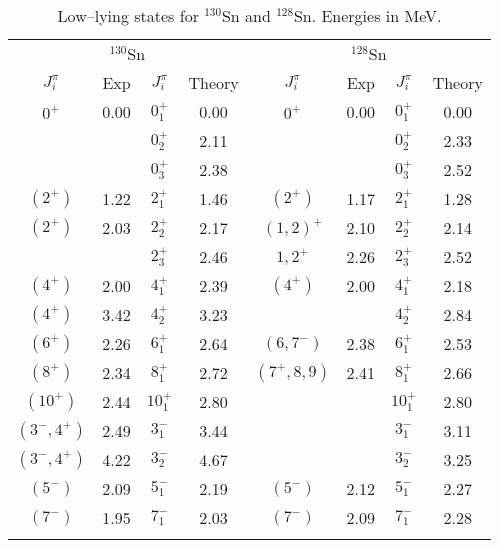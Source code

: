 \begin{table}[htbp]
\begin{center}
\begin{tabular}{cccc|cccc}
\hline
\multicolumn{4}{c}{ $^{130}$Sn} & \multicolumn{4}{c}{ $^{128}$Sn} \\ 
{$J^{\pi}_i$} & {Exp} & {$J^{\pi}_i$} & {Theory} & 
{$J^{\pi}_i$} & {Exp} & {$J^{\pi}_i$} & {Theory} \\
\hline 
$0^{+}$ & 0.00 & $0^{+}_{1}$ & 0.00 &
  $0^{+}$ & 0.00 & $0^{+}_{1}$ & 0.00 \\
        &      & $0^{+}_{2}$ & 2.11 &
          &      & $0^{+}_{2}$ & 2.33 \\
        &      & $0^{+}_{3}$ & 2.38 &
          &      & $0^{+}_{3}$ & 2.52 \\
$(2^{+})$ & 1.22 & $2^{+}_{1}$ & 1.46 &
  $(2^{+})$  & 1.17 & $2^{+}_{1}$ & 1.28 \\
$(2^{+})$ & 2.03 & $2^{+}_{2}$ & 2.17 &
  $(1,2)^{+}$ & 2.10 & $2^{+}_{2}$ & 2.14 \\
          &      & $2^{+}_{3}$ & 2.46 &
  $1,2^{+}$   & 2.26 & $2^{+}_{3}$ & 2.52 \\
$(4^{+})$ & 2.00 & $4^{+}_{1}$ & 2.39 &
  $(4^{+})$ & 2.00 & $4^{+}_{1}$ & 2.18 \\
$(4^{+})$ & 3.42 & $4^{+}_{2}$ & 3.23 &
            &      & $4^{+}_{2}$ & 2.84 \\
$(6^{+})$ & 2.26 & $6^{+}_{1}$ & 2.64 &
  $(6,7^{-})$ & 2.38 & $6^{+}_{1}$ & 2.53 \\
$(8^{+})$ & 2.34 & $8^{+}_{1}$ & 2.72 &
  $(7^{+},8,9)$ & 2.41 & $8^{+}_{1}$ & 2.66 \\
$(10^{+})$ & 2.44 & $10^{+}_{1}$ & 2.80 &
                &     & $10^{+}_{1}$ & 2.80 \\
%
$(3^{-},4^{+})$ & 2.49 & $3^{-}_{1}$ & 3.44 &
                &      & $3^{-}_{1}$ & 3.11 \\
$(3^{-},4^{+})$ & 4.22 & $3^{-}_{2}$ & 4.67 &
                &      & $3^{-}_{2}$ & 3.25 \\
$(5^{-})$ & 2.09 & $5^{-}_{1}$ & 2.19 &
  $(5^{-})$ & 2.12 & $5^{-}_{1}$ & 2.27 \\
$(7^{-})$ & 1.95 & $7^{-}_{1}$ & 2.03 &
  $(7^{-})$ & 2.09 & $7^{-}_{1}$ & 2.28 \\
&&&\\ \hline
\end{tabular}
\caption{Low--lying states for  $^{130}$Sn and $^{128}$Sn. Energies in MeV.}
\label{tab:sn130}
\end{center}
\end{table}




